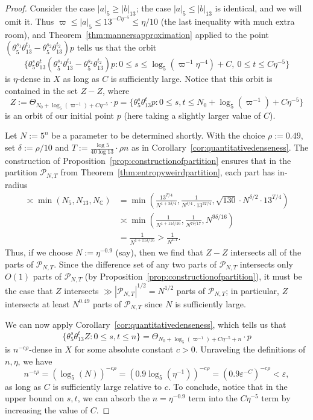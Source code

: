 \documentclass[11pt]{amsart}
\theoremstyle{definition}
\newcommand{\C}{{\mathbb C}}
\begin{document}
\begin{proof}
Consider the case $|a|_5 \geq |b|_{13}$; the case $|a|_5 \leq |b|_{13}$ is identical, and we will omit it.  Thus $\varpi \leq |a|_5 \leq 13^{-C\eta^{-5}} \leq \eta/10$ (the last inequality with much extra room), and Theorem~\ref{thm:mannersapproximation} applied to the point $(\theta_5^{s_1}\theta_{13}^{t_1}-\theta_5^{s_2}\theta_{13}^{t_2})p$ tells us that the orbit
$$\{\theta_5^s \theta_{13}^t (\theta_5^{s_1}\theta_{13}^{t_1}-\theta_5^{s_2}\theta_{13}^{t_2})p: 0 \leq s \leq \log_5(\varpi^{-1} \eta^{-4})+C, ~ 0 \leq t \leq C\eta^{-5}\}$$
is $\eta$-dense in $X$ as long as $C$ is sufficiently large.  Notice that this orbit is contained in the set $Z-Z$, where
$$Z:=\Theta_{N_0+\log_5(\varpi^{-1})+C\eta^{-5}} \cdot p=\{\theta_5^s \theta_{13}^t p: 0 \leq s, t \leq N_0+\log_5(\varpi^{-1})+C\eta^{-5}\}$$
is an orbit of our initial point $p$ (here taking a slightly larger value of $C$).

Let $N:=5^n$ be a parameter to be determined shortly.  With the choice $\rho:=0.49$, set $\delta:=\rho/10$ and $T:=\frac{\log 5}{40 \log 13} \cdot \rho n$ as in Corollary~\ref{cor:quantitativedenseness}.  The construction of Proposition~\ref{prop:constructionofpartition} ensures that in the partition $\mathcal{P}_{N,T}$ from Theorem~\ref{thm:entropyweirdpartition}, each part has in-radius
\begin{align*}
\asymp \min(N_5,N_{13},N_{\C}) &=\min\left(\frac{13^{T/4}}{N^{1+3\delta/4}}, \frac{1}{N^{\delta/4} \cdot 13^{3T/4}}, \sqrt{130} \cdot N^{\delta/2} \cdot 13^{T/4}  \right)\\
 &\asymp \min \left(\frac{1}{N^{1+11\delta/16}}, \frac{1}{N^{7\delta/17}}, N^{9\delta/16} \right)\\
 &=\frac{1}{N^{1+11\delta/16}}>\frac{1}{N^{1.1}}.
 \end{align*}
Thus, if we choose $N:=\eta^{-0.9}$ (say), then we find that $Z-Z$
intersects all of the parts of $\mathcal{P}_{N,T}$.  Since the difference set of any two parts of $\mathcal{P}_{N,T}$ intersects only $O(1)$ parts of $\mathcal{P}_{N,T}$ (by Proposition~\ref{prop:constructionofpartition}), it must be the case that $Z$ intersects $\gg |\mathcal{P}_{N,T}|^{1/2}=N^{1/2}$ parts of $\mathcal{P}_{N,T}$; in particular, $Z$ intersects at least $N^{0.49}$ parts of $\mathcal{P}_{N,T}$ since $N$ is sufficiently large.

We can now apply Corollary~\ref{cor:quantitativedenseness}, which tells us that
$$\{\theta_5^s \theta_{13}^t Z: 0 \leq s,t \leq n\}=\Theta_{N_0+\log_5(\varpi^{-1})+C\eta^{-5}+n} \cdot p$$
is $n^{-c\rho}$-dense in $X$ for some absolute constant $c>0$.  Unraveling the definitions of $n,\eta$, we have
$$n^{-c\rho}=(\log_5(N))^{-c\rho}=(0.9\log_5(\eta^{-1}))^{-c\rho}=(0.9\varepsilon^{-C})^{-c\rho}<\varepsilon,$$
as long as $C$ is sufficiently large relative to $c$.  To conclude, notice that in the upper bound on $s,t$, we can absorb the $n=\eta^{-0.9}$ term into the $C\eta^{-5}$ term by increasing the value of $C$.
\end{proof}
\end{document}
